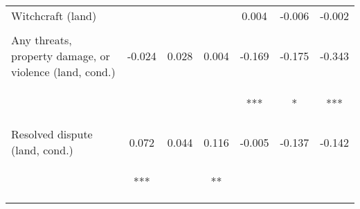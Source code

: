 \begin{tabular}{lcccccc}
\noalign{\smallskip}Witchcraft (land) &  &  &  & 0.004 & -0.006 & -0.002\\
 & \begin{footnotesize}\end{footnotesize} & \begin{footnotesize}\end{footnotesize} & \begin{footnotesize}\end{footnotesize} & \begin{footnotesize}[0.003]\end{footnotesize} & \begin{footnotesize}[0.004]\end{footnotesize} & \begin{footnotesize}[0.003]\end{footnotesize}\\
\noalign{\smallskip}Any threats, property damage, or violence (land, cond.) & -0.024 & 0.028 & 0.004 & -0.169 & -0.175 & -0.343\\
 & \begin{footnotesize}[0.035]\end{footnotesize} & \begin{footnotesize}[0.061]\end{footnotesize} & \begin{footnotesize}[0.058]\end{footnotesize} & \begin{footnotesize}[0.049]***\end{footnotesize} & \begin{footnotesize}[0.091]*\end{footnotesize} & \begin{footnotesize}[0.087]***\end{footnotesize}\\
\noalign{\smallskip}Resolved dispute (land, cond.) & 0.072 & 0.044 & 0.116 & -0.005 & -0.137 & -0.142\\
 & \begin{footnotesize}[0.027]***\end{footnotesize} & \begin{footnotesize}[0.051]\end{footnotesize} & \begin{footnotesize}[0.048]**\end{footnotesize} & \begin{footnotesize}[0.047]\end{footnotesize} & \begin{footnotesize}[0.096]\end{footnotesize} & \begin{footnotesize}[0.093]\end{footnotesize}\\

\end{tabular}
